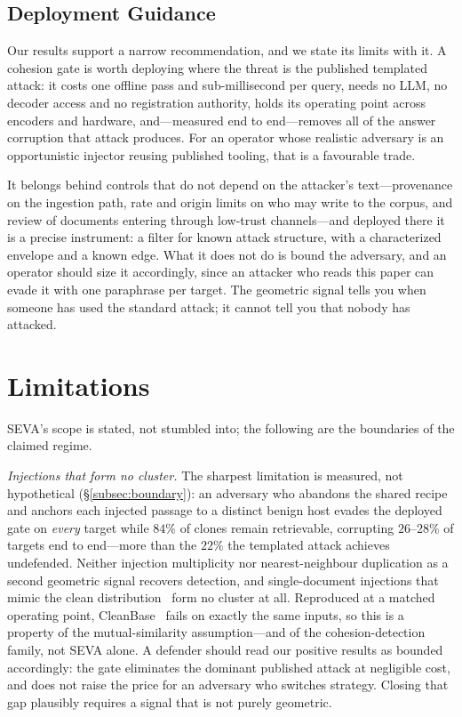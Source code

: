 \documentclass[10pt,journal,compsoc]{IEEEtran}
\begin{document}
\subsection{Deployment Guidance}
\label{app:guidance}
Our results support a narrow recommendation, and we state its limits with it. A cohesion gate is
worth deploying where the threat is the published templated attack: it costs one offline pass and
sub-millisecond per query, needs no LLM, no decoder access and no registration authority, holds
its operating point across encoders and hardware, and---measured end to end---removes all of the
answer corruption that attack produces. For an operator whose realistic adversary is an
opportunistic injector reusing published tooling, that is a favourable trade.

It belongs behind controls that do not depend on the attacker's text---provenance on the
ingestion path, rate and origin limits on who may write to the corpus, and review of documents
entering through low-trust channels---and deployed there it is a precise instrument: a filter for
known attack structure, with a characterized envelope and a known edge. What it does not do is
bound the adversary, and an operator should size it accordingly, since an attacker who reads this
paper can evade it with one paraphrase per target. The geometric signal tells you when someone
has used the standard attack; it cannot tell you that nobody has attacked.

\section{Limitations}
\label{sec:limits}
SEVA's scope is stated, not stumbled into; the following are the boundaries of the
claimed regime.

\emph{Injections that form no cluster.} The sharpest limitation is measured, not hypothetical
(\S\ref{subsec:boundary}): an adversary who abandons the shared recipe and anchors each injected
passage to a distinct benign host evades the deployed gate on \emph{every} target while $84\%$
of clones remain retrievable, corrupting $26$--$28\%$ of targets end to end---more than the
$22\%$ the templated attack achieves undefended. Neither injection multiplicity nor
nearest-neighbour duplication as a second geometric signal recovers detection, and
single-document injections that mimic the clean distribution~\cite{corruptrag} form no cluster
at all. Reproduced at a matched operating point, CleanBase~\cite{cleanbase} fails on exactly the
same inputs, so this is a property of the mutual-similarity assumption---and of the
cohesion-detection family, not SEVA alone. A defender should read our positive results as
bounded accordingly: the gate eliminates the dominant published attack at negligible cost, and
does not raise the price for an adversary who switches strategy. Closing that gap plausibly
requires a signal that is not purely geometric.
\end{document}
